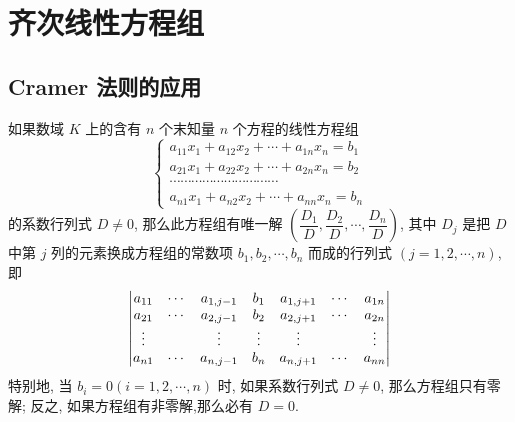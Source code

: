 \section{齐次线性方程组}

\subsection{Cramer 法则的应用}

\begin{theorem}[Cramer 法则]
    如果数域 $ K $ 上的含有 $ n $ 个末知量 $ n $ 个方程的线性方程组
    $$\begin{cases}
            a_{11} x_{1}+a_{12} x_{2}+\cdots+a_{1 n} x_{n}=b_{1}                  \\
            a_{21} x_{1}+a_{22} x_{2}+\cdots+a_{2 n} x_{n}=b_{2}                  \\
            \cdots \cdots \cdots \cdots \cdots \cdots \cdots \cdots \cdots \cdots \\
            a_{n 1} x_{1}+a_{n 2} x_{2}+\cdots+a_{n n} x_{n}=b_{n}
        \end{cases}$$
    的系数行列式 $ D \neq 0$, 那么此方程组有唯一解 $ \left(\dfrac{D_{1}}{D}, \dfrac{D_{2}}{D}, \cdots, \dfrac{D_{n}}{D}\right)$,
    其中 $ D_{j} $ 是把 $ D $ 中第 $ j $ 列的元素换成方程组的常数项 $ b_{1}, b_{2}, \cdots, b_{n} $ 而成的行列式 $ (j=1,2, \cdots, n)$, 即
    $$\mqty|a_{11}  & \cdots & a_{1, j-1} & b_{1}  & a_{1, j+1} & \cdots & a_{1 n} \\
        a_{21}  & \cdots & a_{2, j-1} & b_{2}  & a_{2, j+1} & \cdots & a_{2 n} \\
        \vdots  &        & \vdots     & \vdots & \vdots     &        & \vdots  \\
        a_{n 1} & \cdots & a_{n, j-1} & b_{n}  & a_{n, j+1} & \cdots & a_{n n}|$$
    特别地, 当 $ b_{i}=0(i=1,2, \cdots, n) $ 时, 如果系数行列式 $ D \neq 0 $, 那么方程组只有零解;
    反之, 如果方程组有非零解,那么必有 $ D=0 .$
\end{theorem}


